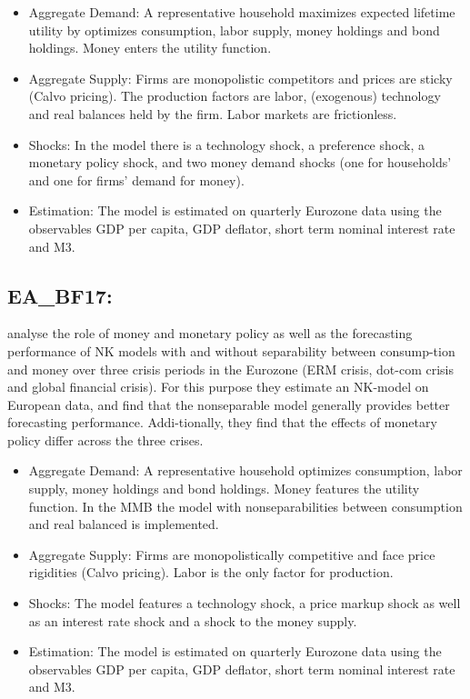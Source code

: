\documentclass[11pt,a4paper]{article}
\begin{document}
	\begin{itemize}
		\item Aggregate Demand: A representative household maximizes expected lifetime utility by optimizes consumption, labor supply, money holdings and bond holdings. Money enters the utility function.
		\item Aggregate Supply: Firms are monopolistic competitors and prices are sticky (Calvo pricing). The production factors are labor, (exogenous) technology and real balances held by the firm. Labor markets are frictionless. 
		\item Shocks: In the model there is a technology shock, a preference shock, a monetary policy shock, and two money demand shocks (one for households' and one for firms' demand for money).
		\item Estimation: The model is estimated on quarterly Eurozone data using the observables GDP per capita, GDP deflator, short term nominal interest rate and M3.
	\end{itemize}
	
	
	\subsection{EA\_BF17: \cite{benchimol2017money}}
	\label{EABF17}
	\cite{benchimol2017money} analyse the role of money and monetary policy as well as the forecasting performance of NK models with and without separability between consump-tion and money over three crisis periods in the Eurozone (ERM crisis, dot-com crisis and global financial crisis). For this purpose they estimate an NK-model on European data, and find that the nonseparable model generally provides better forecasting performance. Addi-tionally, they find that the effects of monetary policy differ across the three crises.
	
	\begin{itemize}
		\item Aggregate Demand: A representative household optimizes consumption, labor supply, money holdings and bond holdings. Money features the utility function. In the MMB the model with nonseparabilities between consumption and real balanced is implemented.
		\item Aggregate Supply: Firms are monopolistically competitive and face price rigidities (Calvo pricing). Labor is the only factor for production. 
		\item Shocks: The model features a technology shock, a price markup shock as well as an interest rate shock and a shock to the money supply.
		\item Estimation: The model is estimated on quarterly Eurozone data using the observables GDP per capita, GDP deflator, short term nominal interest rate and M3.
	\end{itemize}
	
\end{document}
